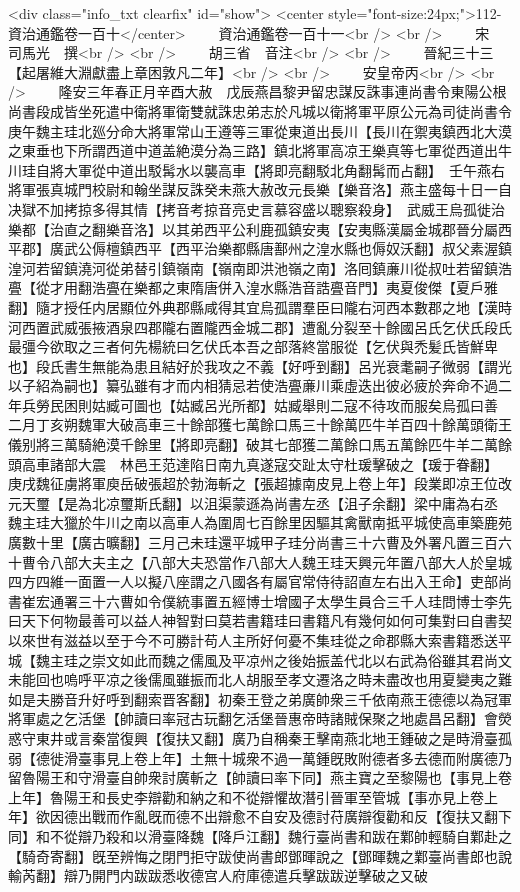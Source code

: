 <div class="info_txt clearfix" id="show">
<center style="font-size:24px;">112-資治通鑑卷一百十</center>
  　　資治通鑑卷一百十一<br />
<br />
　　宋　司馬光　撰<br />
<br />
　　胡三省　音注<br />
<br />
　　晉紀三十三【起屠維大淵獻盡上章困敦凡二年】<br />
<br />
　　安皇帝丙<br />
<br />
　　隆安三年春正月辛酉大赦　戊辰燕昌黎尹留忠謀反誅事連尚書令東陽公根尚書段成皆坐死遣中衛將軍衛雙就誅忠弟志於凡城以衛將軍平原公元為司徒尚書令　庚午魏主珪北廵分命大將軍常山王遵等三軍從東道出長川【長川在禦夷鎮西北大漠之東垂也下所謂西道中道盖絶漠分為三路】鎮北將軍高凉王樂真等七軍從西道出牛川珪自將大軍從中道出駁髯水以襲高車【將即亮翻駁北角翻髯而占翻】　壬午燕右將軍張真城門校尉和翰坐謀反誅癸未燕大赦改元長樂【樂音洛】燕主盛每十日一自决獄不加拷掠多得其情【拷音考掠音亮史言慕容盛以聰察殺身】　武威王烏孤徙治樂都【治直之翻樂音洛】以其弟西平公利鹿孤鎮安夷【安夷縣漢屬金城郡晉分屬西平郡】廣武公傉檀鎮西平【西平治樂都縣唐鄯州之湟水縣也傉奴沃翻】叔父素渥鎮湟河若留鎮澆河從弟替引鎮嶺南【嶺南即洪池嶺之南】洛囘鎮亷川從叔吐若留鎮浩亹【從才用翻浩亹在樂都之東隋唐併入湟水縣浩音誥亹音門】夷夏俊傑【夏戶雅翻】隨才授任内居顯位外典郡縣咸得其宜烏孤謂羣臣曰隴右河西本數郡之地【漢時河西置武威張掖酒泉四郡隴右置隴西金城二郡】遭亂分裂至十餘國呂氏乞伏氏段氏最彊今欲取之三者何先楊統曰乞伏氏本吾之部落終當服從【乞伏與禿髪氏皆鮮卑也】段氏書生無能為患且結好於我攻之不義【好呼到翻】呂光衰耄嗣子微弱【謂光以子紹為嗣也】纂弘雖有才而内相猜忌若使浩亹亷川乘虛迭出彼必疲於奔命不過二年兵勞民困則姑臧可圖也【姑臧呂光所都】姑臧舉則二寇不待攻而服矣烏孤曰善　二月丁亥朔魏軍大破高車三十餘部獲七萬餘口馬三十餘萬匹牛羊百四十餘萬頭衛王儀别將三萬騎絶漠千餘里【將即亮翻】破其七部獲二萬餘口馬五萬餘匹牛羊二萬餘頭高車諸部大震　林邑王范達陷日南九真遂寇交趾太守杜瑗擊破之【瑗于眷翻】　庚戌魏征虜將軍庾岳破張超於勃海斬之【張超據南皮見上卷上年】段業即凉王位改元天璽【是為北凉璽斯氏翻】以沮渠蒙遜為尚書左丞【沮子余翻】梁中庸為右丞　魏主珪大獵於牛川之南以高車人為圍周七百餘里因驅其禽獸南抵平城使高車築鹿苑廣數十里【廣古曠翻】三月己未珪還平城甲子珪分尚書三十六曹及外署凡置三百六十曹令八部大夫主之【八部大夫恐當作八部大人魏王珪天興元年置八部大人於皇城四方四維一面置一人以擬八座謂之八國各有屬官常侍待詔直左右出入王命】吏部尚書崔宏通署三十六曹如令僕統事置五經博士增國子太學生員合三千人珪問博士李先曰天下何物最善可以益人神智對曰莫若書籍珪曰書籍凡有幾何如何可集對曰自書契以來世有滋益以至于今不可勝計苟人主所好何憂不集珪從之命郡縣大索書籍悉送平城【魏主珪之崇文如此而魏之儒風及平凉州之後始振盖代北以右武為俗雖其君尚文未能回也嗚呼平凉之後儒風雖振而北人胡服至孝文遷洛之時未盡改也用夏變夷之難如是夫勝音升好呼到翻索晋客翻】初秦王登之弟廣帥衆三千依南燕王德德以為冠軍將軍處之乞活堡【帥讀曰率冠古玩翻乞活堡晉惠帝時諸賊保聚之地處昌呂翻】會熒惑守東井或言秦當復興【復扶又翻】廣乃自稱秦王擊南燕北地王鍾破之是時滑臺孤弱【德徙滑臺事見上卷上年】土無十城衆不過一萬鍾旣敗附德者多去德而附廣德乃留魯陽王和守滑臺自帥衆討廣斬之【帥讀曰率下同】燕主寶之至黎陽也【事見上卷上年】魯陽王和長史李辯勸和納之和不從辯懼故潛引晉軍至管城【事亦見上卷上年】欲因德出戰而作亂旣而德不出辯愈不自安及德討苻廣辯復勸和反【復扶又翻下同】和不從辯乃殺和以滑臺降魏【降戶江翻】魏行臺尚書和跋在鄴帥輕騎自鄴赴之【騎奇寄翻】旣至辨悔之閉門拒守跋使尚書郎鄧暉說之【鄧暉魏之鄴臺尚書郎也說輸芮翻】辯乃開門内跋跋悉收德宫人府庫德遣兵擊跋跋逆擊破之又破